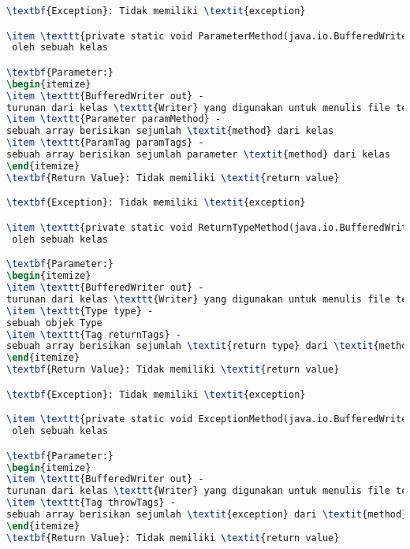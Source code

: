 \begin{lstlisting}[language=TeX, caption=Hasil Pengujian kode program perangkat lunak]
\textbf{Exception}: Tidak memiliki \textit{exception}

\item \texttt{private static void ParameterMethod(java.io.BufferedWriter out, Parameter[] paramMethod, ParamTag[] paramTags)}\textit{Method} ini akan menampilkan parameter \textit{method-method} yang dimiliki
 oleh sebuah kelas

\textbf{Parameter:}
\begin{itemize}
\item \texttt{BufferedWriter out} - 
turunan dari kelas \texttt{Writer} yang digunakan untuk menulis file text
\item \texttt{Parameter paramMethod} - 
sebuah array berisikan sejumlah \textit{method} dari kelas
\item \texttt{ParamTag paramTags} - 
sebuah array berisikan sejumlah parameter \textit{method} dari kelas
\end{itemize}
\textbf{Return Value}: Tidak memiliki \textit{return value}

\textbf{Exception}: Tidak memiliki \textit{exception}

\item \texttt{private static void ReturnTypeMethod(java.io.BufferedWriter out, Type type, Tag[] returnTags)}\textit{Method} ini akan menampilkan \textit{return type} dari \textit{method-method} yang dimiliki
 oleh sebuah kelas

\textbf{Parameter:}
\begin{itemize}
\item \texttt{BufferedWriter out} - 
turunan dari kelas \texttt{Writer} yang digunakan untuk menulis file text
\item \texttt{Type type} - 
sebuah objek Type
\item \texttt{Tag returnTags} - 
sebuah array berisikan sejumlah \textit{return type} dari \textit{method} dari kelas
\end{itemize}
\textbf{Return Value}: Tidak memiliki \textit{return value}

\textbf{Exception}: Tidak memiliki \textit{exception}

\item \texttt{private static void ExceptionMethod(java.io.BufferedWriter out, Tag[] throwTags)}\textit{Method} ini akan menampilkan \textit{return type} dari \textit{method-method} yang dimiliki
 oleh sebuah kelas

\textbf{Parameter:}
\begin{itemize}
\item \texttt{BufferedWriter out} - 
turunan dari kelas \texttt{Writer} yang digunakan untuk menulis file text
\item \texttt{Tag throwTags} - 
sebuah array berisikan sejumlah \textit{exception} dari \textit{method} dari kelas
\end{itemize}
\textbf{Return Value}: Tidak memiliki \textit{return value}


\end{lstlisting}
